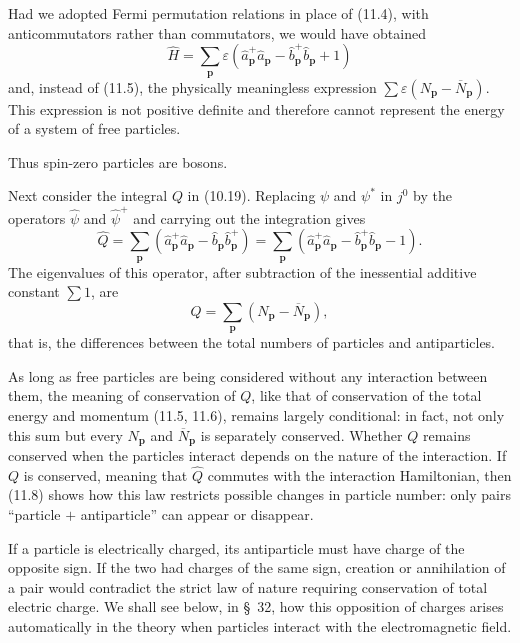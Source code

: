 Had we adopted Fermi permutation relations in place of (11.4), with anticommutators rather than commutators, we would have obtained
\[
\widehat H=\sum_{\mathbf p}\varepsilon
\left(\widehat a^+_{\mathbf p}\widehat a_{\mathbf p}
-\widehat b^+_{\mathbf p}\widehat b_{\mathbf p}+1\right)
\]
and, instead of (11.5), the physically meaningless expression $\sum\varepsilon(N_{\mathbf p}-\overline N_{\mathbf p})$. This expression is not positive definite and therefore cannot represent the energy of a system of free particles.

Thus spin-zero particles are bosons.

Next consider the integral $Q$ in (10.19). Replacing $\psi$ and $\psi^*$ in $j^0$ by the operators $\widehat\psi$ and $\widehat\psi^+$ and carrying out the integration gives
\begin{equation}
\widehat Q
=\sum_{\mathbf p}\left(\widehat a^+_{\mathbf p}\widehat a_{\mathbf p}
-\widehat b_{\mathbf p}\widehat b^+_{\mathbf p}\right)
=\sum_{\mathbf p}\left(\widehat a^+_{\mathbf p}\widehat a_{\mathbf p}
-\widehat b^+_{\mathbf p}\widehat b_{\mathbf p}-1\right).
\tag{11.7}
\end{equation}
The eigenvalues of this operator, after subtraction of the inessential additive constant $\sum1$, are
\begin{equation}
Q=\sum_{\mathbf p}\left(N_{\mathbf p}-\overline N_{\mathbf p}\right),
\tag{11.8}
\end{equation}
that is, the differences between the total numbers of particles and antiparticles.

As long as free particles are being considered without any interaction between them, the meaning of conservation of $Q$, like that of conservation of the total energy and momentum (11.5, 11.6), remains largely conditional: in fact, not only this sum but every $N_{\mathbf p}$ and $\overline N_{\mathbf p}$ is separately conserved. Whether $Q$ remains conserved when the particles interact depends on the nature of the interaction. If $Q$ is conserved, meaning that $\widehat Q$ commutes with the interaction Hamiltonian, then (11.8) shows how this law restricts possible changes in particle number: only pairs ``particle $+$ antiparticle'' can appear or disappear.

If a particle is electrically charged, its antiparticle must have charge of the opposite sign. If the two had charges of the same sign, creation or annihilation of a pair would contradict the strict law of nature requiring conservation of total electric charge. We shall see below, in \S~32, how this opposition of charges arises automatically in the theory when particles interact with the electromagnetic field.

